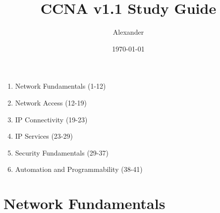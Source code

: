 \documentclass{article}
\title{CCNA v1.1 Study Guide}
\author{Alexander}
\date{\today}
\begin{document}
\maketitle

\begin{enumerate}
  \item Network Fundamentals (1-12)
  \item Network Access (12-19)
  \item IP Connectivity (19-23)
  \item IP Services (23-29)
  \item Security Fundamentals (29-37)
  \item Automation and Programmability (38-41)
\end{enumerate}

\section{Network Fundamentals}
\end{document}
